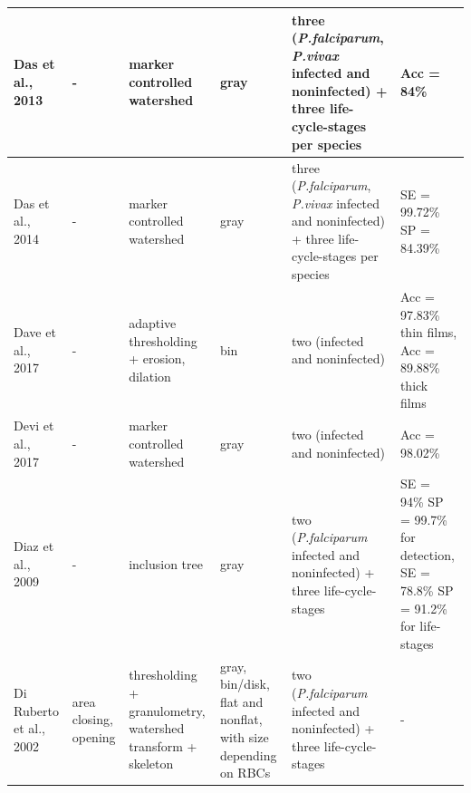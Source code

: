 \documentclass[sensors,review,accept,moreauthors,pdftex,10pt,a4paper]{mdpi}
\begin{document}
\begin{table}[H]
\begin{tabular}{m{3cm}<{\centering}m{3cm}<{\centering}m{5cm}<{\centering}m{3cm}<{\centering}m{5cm}<{\centering}m{2cm}<{\centering}}
    Das et al., 2013 &
		- &
		marker controlled watershed &	
		gray &
	three (\emph{P.falciparum}, \emph{P.vivax} infected and noninfected) + three life-cycle-stages per species &
		Acc = 84\%
        \\
        \midrule
    Das et al., 2014 &
		- &
		marker controlled watershed &	
		gray &
	three (\emph{P.falciparum}, \emph{P.vivax} infected and noninfected) + three life-cycle-stages per species &
		SE = 99.72\% SP = 84.39\%
        \\
        \midrule
    Dave et al., 2017 &
		- &
		adaptive thresholding + erosion, dilation &	
		bin &
		two (infected and noninfected) &
		Acc = 97.83\% thin films, Acc = 89.88\% thick films
        \\
        \midrule
    Devi et al., 2017 &
		- &
		marker controlled watershed &	
		gray &
		two (infected and noninfected)  &
		Acc = 98.02\%
        \\
        \midrule
    Diaz et al., 2009 &
		- &
		inclusion tree &	
		gray &
		two (\emph{P.falciparum} infected and noninfected) + three life-cycle-stages &
		SE = 94\% SP = 99.7\% for detection, SE = 78.8\% SP = 91.2\% for life-stages
		\\
		        \midrule	
		  Di Ruberto et al., 2002 &
		area closing, opening &
		thresholding + granulometry, watershed  transform + skeleton &	
		gray, bin/disk, flat and nonflat, with size depending on RBCs &
		two (\emph{P.falciparum} infected and noninfected) + three life-cycle-stages &
		-
		\\
	\bottomrule
\end{tabular}  \end{table}
\end{document}
